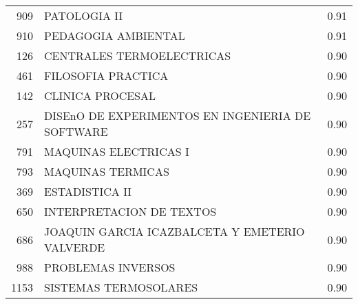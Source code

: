 \documentclass[12pt]{article}
\begin{document}
\begin{table}[ht]
\begin{tabular}{rlr}
  909 & PATOLOGIA II & 0.91 \\ 
  910 & PEDAGOGIA AMBIENTAL & 0.91 \\ 
  126 & CENTRALES TERMOELECTRICAS & 0.90 \\ 
  461 & FILOSOFIA PRACTICA & 0.90 \\ 
  142 & CLINICA PROCESAL & 0.90 \\ 
  257 & DISEnO DE EXPERIMENTOS EN INGENIERIA DE SOFTWARE & 0.90 \\ 
  791 & MAQUINAS ELECTRICAS I & 0.90 \\ 
  793 & MAQUINAS TERMICAS & 0.90 \\ 
  369 & ESTADISTICA II & 0.90 \\ 
  650 & INTERPRETACION DE TEXTOS & 0.90 \\ 
  686 & JOAQUIN GARCIA ICAZBALCETA Y EMETERIO VALVERDE & 0.90 \\ 
  988 & PROBLEMAS INVERSOS & 0.90 \\ 
  1153 & SISTEMAS TERMOSOLARES & 0.90 \\ 
   \hline
\end{tabular}
\end{table}
\end{document}
